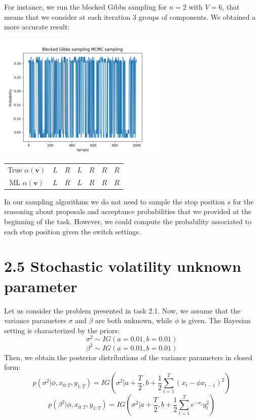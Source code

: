 \documentclass[]{article}
\begin{document}
For instance, we run the blocked Gibbs sampling for $n=2$ with $V=6$, that means that we consider at each iteration 3 groups of components. We obtained a more accurate result:
\begin{center}
	\includegraphics[height=6cm]{task3/V_6_T_6_N_10000_Blocked_Gibbs.png}
	\begin{tabular}{| c | c | c | c | c | c | c |}
		True $\alpha(\mathbf{v})$ & $L$ & $R$ & $L$ & $R$ & $R$ & $R$ \\
		ML $\alpha(\mathbf{v})$ & $L$ & $R$ & $L$ & $R$ & $R$ & $R$ \\
	\end{tabular}
\end{center}

In our sampling algorithms we do not need to sample the stop position $s$ for the reasoning about proposals and acceptance probabilities that we provided at the beginning of the task. However, we could compute the probability associated to each stop position given the switch settings. 

\newpage

\section*{2.5 Stochastic volatility unknown parameter}
Let us consider the problem presented in task 2.1. Now, we assume that the variance parameters $\sigma$ and $\beta$ are both unknown, while $\phi$ is given. The Bayesian setting is characterized by the priors:
$$
\sigma^2 \sim \mathit{IG}(a=0.01, b=0.01)
$$
$$
\beta^2 \sim \mathit{IG}(a=0.01, b=0.01)
$$
Then, we obtain the posterior distributions of the variance parameters in closed form:
$$
p(\sigma^2|\phi, x_{0:T}, y_{1:T}) = \mathit{IG}(\sigma^2|a+\frac{T}{2}, b+\frac{1}{2}\sum_{t=1}^{T}(x_t-\phi x_{t-1})^2)
$$
$$
p(\beta^2|\phi, x_{0:T}, y_{1:T}) = \mathit{IG}(\sigma^2|a+\frac{T}{2}, b+\frac{1}{2}\sum_{t=1}^{T}e^{-x_t}y_t^2)
$$
\end{document}
